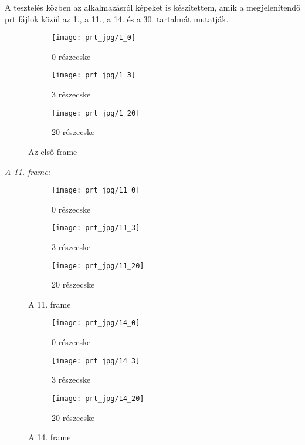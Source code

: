 A tesztelés közben az alkalmazásról képeket is készítettem,
amik a megjelenítendő prt fájlok közül az 1., a 11., a 14. 
és a 30. tartalmát mutatják.

\begin{figure}[!htb]
    \centering
    \begin{subfigure}[!htb]{0.32\textwidth}
        \centering
        \texttt{[image: prt\_jpg/1\_0]}
        \caption{0 részecske}
    \end{subfigure}
    \hfill
    \begin{subfigure}[!htb]{0.32\textwidth}
        \centering
        \texttt{[image: prt\_jpg/1\_3]}
        \caption{3 részecske}
    \end{subfigure}
    \hfill
    \begin{subfigure}[!htb]{0.32\textwidth}
        \centering
        \texttt{[image: prt\_jpg/1\_20]}
        \caption{20 részecske}
    \end{subfigure}
    \caption{Az első frame}
    \label{fig:x firstframe}
\end{figure}

\clearpage
{\noindent\itshape A 11. frame:}
\begin{figure}[!htb]
    \centering
    \begin{subfigure}[!htb]{0.32\textwidth}
        \centering
        \texttt{[image: prt\_jpg/11\_0]}
        \caption{0 részecske}
    \end{subfigure}
    \hfill
    \begin{subfigure}[!htb]{0.32\textwidth}
        \centering
        \texttt{[image: prt\_jpg/11\_3]}
        \caption{3 részecske}
    \end{subfigure}
    \hfill
    \begin{subfigure}[!htb]{0.32\textwidth}
        \centering
        \texttt{[image: prt\_jpg/11\_20]}
        \caption{20 részecske}
    \end{subfigure}
    \caption{A 11. frame}
    \label{fig:x frameeleven}
\end{figure}

\begin{figure}[!htb]
    \centering
    \begin{subfigure}[!htb]{0.32\textwidth}
        \centering
        \texttt{[image: prt\_jpg/14\_0]}
        \caption{0 részecske}
    \end{subfigure}
    \hfill
    \begin{subfigure}[!htb]{0.32\textwidth}
        \centering
        \texttt{[image: prt\_jpg/14\_3]}
        \caption{3 részecske}
    \end{subfigure}
    \hfill
    \begin{subfigure}[!htb]{0.32\textwidth}
        \centering
        \texttt{[image: prt\_jpg/14\_20]}
        \caption{20 részecske}
    \end{subfigure}
    \caption{A 14. frame}
    \label{fig:x frame14}
\end{figure}

